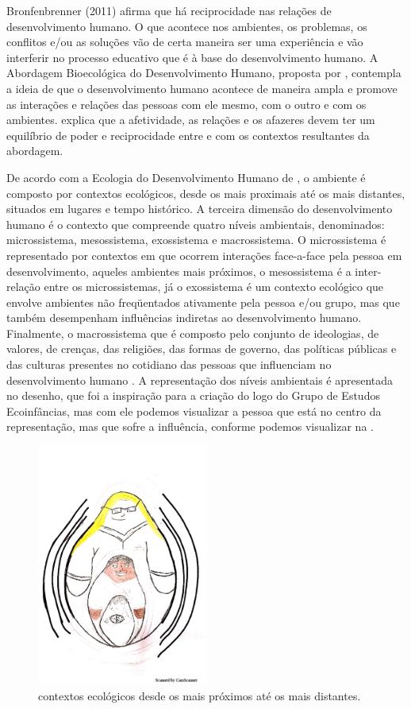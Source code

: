 \documentclass{textolivre}
\begin{document}
Bronfenbrenner (2011) afirma que há reciprocidade nas relações de desenvolvimento humano. O que acontece nos ambientes, os problemas, os conflitos e/ou as soluções vão de certa maneira ser uma experiência e vão interferir no processo educativo que é à base do desenvolvimento humano. A Abordagem Bioecológica do Desenvolvimento Humano, proposta por \textcite{brofen2011}, contempla a ideia de que o desenvolvimento humano acontece de maneira ampla e promove as interações e relações das pessoas com ele mesmo, com o outro e com os ambientes. \textcite{brofen1996} explica que a afetividade, as relações e os afazeres devem ter um equilíbrio de poder e reciprocidade entre e com os contextos resultantes da abordagem. 

De acordo com a Ecologia do Desenvolvimento Humano de \textcite{brofen1996}, o ambiente é composto por contextos ecológicos, desde os mais proximais até os mais distantes, situados em lugares e tempo histórico. A terceira dimensão do desenvolvimento humano é o contexto que compreende quatro níveis ambientais, denominados: microssistema, mesossistema, exossistema e macrossistema. O microssistema é representado por contextos em que ocorrem interações face-a-face pela pessoa em desenvolvimento, aqueles ambientes mais próximos, o mesossistema é a inter-relação entre os microssistemas, já o exossistema é um contexto ecológico que envolve ambientes não freqüentados ativamente pela pessoa e/ou grupo, mas que também desempenham influências indiretas ao desenvolvimento humano. Finalmente, o macrossistema que é composto pelo conjunto de ideologias, de valores, de crenças, das religiões, das formas de governo, das políticas públicas e das culturas presentes no cotidiano das pessoas que influenciam no desenvolvimento humano \cite{brofen1996,piske2019}. A representação dos níveis ambientais é apresentada no desenho, que foi a inspiração para a criação do logo do Grupo de Estudos Ecoinfâncias, mas com ele podemos visualizar a pessoa que está no centro da representação, mas que sofre a influência, conforme podemos visualizar na .

\begin{figure}[h!]
 \centering
 \includegraphics[width=0.5\textwidth]{figure01.png}
 \caption{contextos ecológicos desde os mais próximos até os mais distantes.}
 \label{fig-fig01}
\end{figure}
\end{document}

